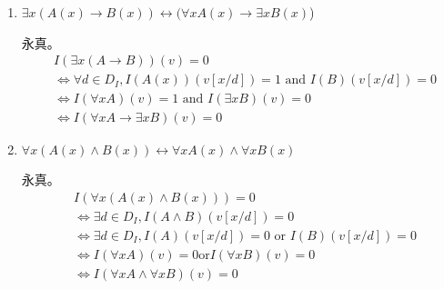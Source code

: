 \documentclass[UTF8]{ctexart}
\begin{document}
\begin{enumerate}
\begin{enumerate}
            \item $\exists x(A(x)\rightarrow B(x))\leftrightarrow (\forall xA(x)\rightarrow \exists xB(x)$)
            
            永真。
            \[
                \begin{aligned}
                    &I(\exists x(A\rightarrow B))(v)=0\\
                    &\Leftrightarrow \forall d\in D_I,I(A(x))(v[x/d])=1 \text{ and } I(B)(v[x/d])=0\\
                    &\Leftrightarrow I(\forall xA)(v)=1 \text{ and } I(\exists xB)(v)=0\\
                    &\Leftrightarrow I(\forall xA\rightarrow \exists xB)(v)=0
                \end{aligned}
            \]
            
            \item $\forall x(A(x)\wedge B(x))\leftrightarrow \forall xA(x)\wedge \forall xB(x)$
            
            永真。
            \[
                \begin{aligned}
                    &I(\forall x(A(x)\wedge B(x)))=0\\
                    &\Leftrightarrow \exists d\in D_I,I(A\wedge B)(v[x/d])=0\\
                    &\Leftrightarrow \exists d\in D_I,I(A)(v[x/d])=0 \text{ or } I(B)(v[x/d])=0\\
                    &\Leftrightarrow I(\forall xA)(v)=0 \text{or} I(\forall xB)(v)=0\\
                    &\Leftrightarrow I(\forall xA\wedge \forall xB)(v)=0
                \end{aligned}
            \]
        \end{enumerate}
        
        
    \end{enumerate}
\end{document}
